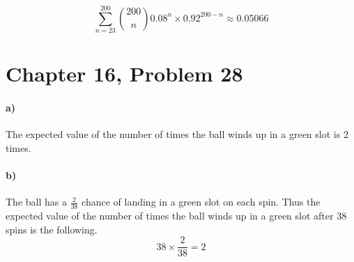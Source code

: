 \documentclass[12pt]{article}
\begin{document}
\[\sum_{n=23}^{200}\binom{200}{n}0.08^n\times0.92^{200-n}\approx0.05066\]

\section*{Chapter 16, Problem 28}

\paragraph{a)}

The expected value of the number of times the ball winds up in a green slot is \(2\) times.

\paragraph{b)}

The ball has a \(\frac{2}{38}\) chance of landing in a green slot on each spin. Thus the expected
value of the number of times the ball winds up in a green slot after 38 spins is the following.
\[38\times\frac{2}{38}=2\]
\end{document}
